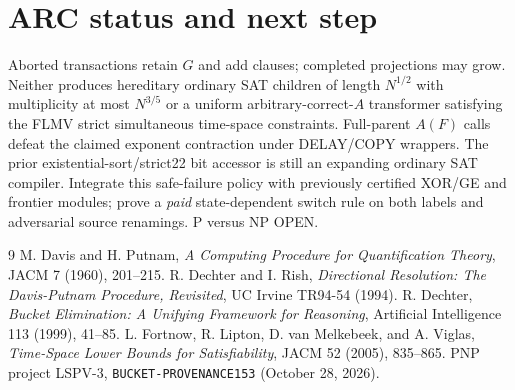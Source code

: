 \documentclass[11pt]{article}
\begin{document}
\section{ARC status and next step}
Aborted transactions retain $G$ and add clauses; completed projections may grow. Neither produces hereditary ordinary SAT children of length $N^{1/2}$ with multiplicity at most $N^{3/5}$ or a uniform arbitrary-correct-$A$ transformer satisfying the FLMV strict simultaneous time-space constraints. Full-parent $A(F)$ calls defeat the claimed exponent contraction under DELAY/COPY wrappers. The prior existential-sort/strict22 bit accessor is still an expanding ordinary SAT compiler. Integrate this safe-failure policy with previously certified XOR/GE and frontier modules; prove a \emph{paid} state-dependent switch rule on both labels and adversarial source renamings. P versus NP OPEN.

\begin{thebibliography}{9}
 M. Davis and H. Putnam, \emph{A Computing Procedure for Quantification Theory}, JACM 7 (1960), 201--215.
 R. Dechter and I. Rish, \emph{Directional Resolution: The Davis-Putnam Procedure, Revisited}, UC Irvine TR94-54 (1994).
 R. Dechter, \emph{Bucket Elimination: A Unifying Framework for Reasoning}, Artificial Intelligence 113 (1999), 41--85.
 L. Fortnow, R. Lipton, D. van Melkebeek, and A. Viglas, \emph{Time-Space Lower Bounds for Satisfiability}, JACM 52 (2005), 835--865.
 PNP project LSPV-3, \texttt{BUCKET-PROVENANCE153} (October 28, 2026).
\end{thebibliography}
\end{document}
